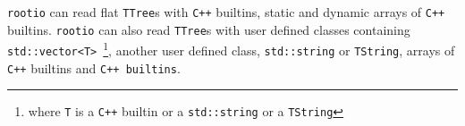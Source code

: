 \documentclass[a4paper]{jpconf}
\begin{document}
\texttt{rootio} can read flat \texttt{TTree}s with \texttt{C++} builtins, static and dynamic arrays of \texttt{C++} builtins.
\texttt{rootio} can also read \texttt{TTree}s with user defined classes containing \texttt{std::vector<T>}~\footnote{where \texttt{T} is a \texttt{C++} builtin or a \texttt{std::string} or a \texttt{TString}}, another user defined class, \texttt{std::string} or \texttt{TString}, arrays of \texttt{C++} builtins and \texttt{C++ builtins}.
\end{document}
